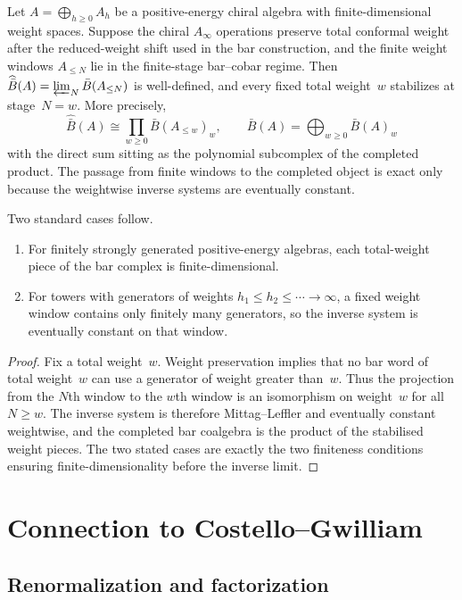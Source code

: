 \begin{proposition}\label{prop:practical-convergence}
Let $A=\bigoplus_{h\ge0}A_h$ be a positive-energy chiral algebra with
finite-dimensional weight spaces.  Suppose the chiral $A_\infty$
operations preserve total conformal weight after the reduced-weight
shift used in the bar construction, and the finite weight windows
$A_{\le N}$ lie in the finite-stage bar--cobar regime.  Then
$\widehat{\bar B}(A)=\varprojlim_N\bar B(A_{\le N})$ is well-defined,
and every fixed total weight~$w$ stabilizes at stage~$N=w$.  More
precisely,
\[
\widehat{\bar B}(A)\cong
\prod_{w\ge0}\bar B(A_{\le w})_w,
\qquad
\bar B(A)=\bigoplus_{w\ge0}\bar B(A)_w
\]
with the direct sum sitting as the polynomial subcomplex of the
completed product.  The passage from finite windows to the completed
object is exact only because the weightwise inverse systems are
eventually constant.

Two standard cases follow.
\begin{enumerate}
\item For finitely strongly generated positive-energy algebras, each
 total-weight piece of the bar complex is finite-dimensional.
\item For towers with generators of weights
 $h_1\le h_2\le\cdots\to\infty$, a fixed weight window contains only
 finitely many generators, so the inverse system is eventually
 constant on that window.
\end{enumerate}
\end{proposition}

\begin{proof}
Fix a total weight~$w$. Weight preservation implies that no bar word
of total weight~$w$ can use a generator of weight greater than~$w$.
Thus the projection from the $N$th window to the $w$th window is an
isomorphism on weight~$w$ for all $N\ge w$. The inverse system is
therefore Mittag--Leffler and eventually constant weightwise, and the
completed bar coalgebra is the product of the stabilised weight
pieces. The two stated cases are exactly the two finiteness
conditions ensuring finite-dimensionality before the inverse limit.
\end{proof}

\section{Connection to Costello--Gwilliam}

\subsection{Renormalization and factorization}

